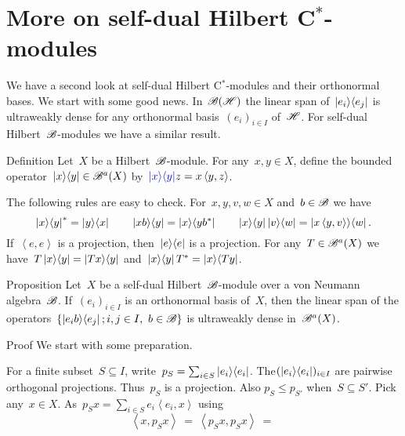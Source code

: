 \documentclass[b]{subfiles}
\begin{document}
\section{More on self-dual Hilbert C$^*$-modules}
\begin{parsec}%
\begin{point}%
We have a second look at
    self-dual Hilbert C$^*$-modules and their orthonormal bases.
We start with some good news.
In~$\mathscr{B}(\mathscr{H})$ the linear span of~$\left|e_i\right>\!\left<e_j\right|$
    is ultraweakly dense for any orthonormal basis~$(e_i)_{i \in I}$
    of~$\mathscr{H}$.
For self-dual Hilbert~$\mathscr{B}$-modules
    we have a similar result.
\end{point}
\begin{point}{Definition}%
Let~$X$ be a Hilbert~$\mathscr{B}$-module.
For any~$x, y \in X$,
define the bounded operator~$\left|x\right>\!\left<y\right| \in \mathscr{B}^a(X)$
by~$\Define{\ketbra{x}{y}} z = x \left<y,z\right>$.
\begin{point}%
The following rules are easy to check.
For~$x,y,v,w \in X$ and~$b \in \mathscr{B}$
    we have
\begin{equation*}
\left|x\right>\!\left<y\right|^* = \left|y\right>\!\left<x\right| \qquad
\left|xb\right>\!\left<y\right| = \left|x\right>\!\left<yb^*\right| \qquad
\left|x\right>\!\left<y\right| \left|v\right>\!\left<w\right| = \left|x\left<y,v\right>\right>\!\left<w\right|.
\end{equation*}
If~$\left<e,e\right>$ is a projection,
    then~$\left|e\right>\!\left<e\right|$ is a projection.
For any~$T \in \mathscr{B}^a(X)$
    we have~$T \left|x\right>\!\left<y\right| = \left|Tx\right>\!\left<y\right|$
    and~$\left|x\right>\!\left<y\right|T^* = \left|x\right>\!\left<Ty\right|$.
\end{point}
\end{point}
\begin{point}{Proposition}%
Let~$X$ be a self-dual Hilbert~$\mathscr{B}$-module over a von Neumann algebra~$\mathscr{B}$.
If~$(e_i)_{i \in I}$ is an orthonormal basis of~$X$,
then the linear span of
    the operators~$\{ \left|e_i b\right>\!\left<e_j\right|; i,j \in I, \ b \in \mathscr{B}\}$
    is ultraweakly dense in~$\mathscr{B}^a(X)$.
\begin{point}{Proof}%
We start with some preparation.
\begin{point}%
For a finite subset~$S \subseteq I$,
    write~$p_S = \sum_{i \in S} \left|e_i\right>\!\left<e_i\right|$.
The$(\left|e_i\right>\!\left<e_i\right|)_{i \in I}$ are pairwise orthogonal projections.
Thus~$p_S$ is a projection.
Also $p_S \leq p_{S'}$ when~$S \subseteq S'$.
Pick any~$x \in X$.
As~$p_S x = \sum_{i \in S} e_i \left<e_i, x\right>$
using
\begin{equation*}
\left<x, p_S x\right> \ =\ 
        \left<p_S x, p_S x\right> \ =\ 

\end{equation*}
\end{point}
\end{point}
\end{point}
\end{parsec}
\end{document}
